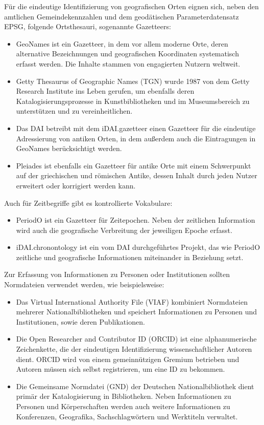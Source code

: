Für die eindeutige Identifizierung von geografischen Orten eignen sich, neben den amtlichen Gemeindekennzahlen und dem geodätischen Parameterdatensatz EPSG, folgende Ortsthesauri, sogenannte Gazetteers:
\begin{itemize}
	\item GeoNames ist ein Gazetteer, in dem vor allem moderne Orte, deren alternative Bezeichnungen und geografischen Koordinaten systematisch erfasst werden. Die Inhalte stammen von engagierten Nutzern weltweit.
	\item Getty Thesaurus of Geographic Names (TGN) wurde 1987 von dem Getty Research Institute ins Leben gerufen, um ebenfalls deren Katalogisierungsprozesse in Kunstbibliotheken und im Museumsbereich zu unterstützen und zu vereinheitlichen.
	\item Das DAI betreibt mit dem iDAI.gazetteer einen Gazetteer für die eindeutige Adressierung von antiken Orten, in dem außerdem auch die Eintragungen in GeoNames berücksichtigt werden.
	\item Pleiades ist ebenfalls ein Gazetteer für antike Orte mit einem Schwerpunkt auf der griechischen und römischen Antike, dessen Inhalt durch jeden Nutzer erweitert oder korrigiert werden kann.
\end{itemize}

Auch für Zeitbegriffe gibt es kontrollierte Vokabulare:
\begin{itemize}
	\item PeriodO ist ein Gazetteer für Zeitepochen. Neben der zeitlichen Information wird auch die geografische Verbreitung der jeweiligen Epoche erfasst.
	\item iDAI.chronontology ist ein vom DAI durchgeführtes Projekt, das wie PeriodO zeitliche und geografische Informationen miteinander in Beziehung setzt.
\end{itemize}

Zur Erfassung von Informationen zu Personen oder Institutionen sollten Normdateien verwendet werden, wie beispielsweise:
\begin{itemize}
	\item Das Virtual International Authority File (VIAF) kombiniert Normdateien mehrerer Nationalbibliotheken und speichert Informationen zu Personen und Institutionen, sowie deren Publikationen.
	\item Die Open Researcher and Contributor ID (ORCID) ist eine alphanumerische Zeichenkette, die der eindeutigen Identifizierung wissenschaftlicher Autoren dient. ORCID wird von einem gemeinnützigen Gremium betrieben und Autoren müssen sich selbst registrieren, um eine ID zu bekommen.
	\item Die Gemeinsame Normdatei (GND) der Deutschen Nationalbibliothek dient primär der Katalogisierung in Bibliotheken. Neben Informationen zu Personen und Körperschaften werden auch weitere Informationen zu Konferenzen, Geografika, Sachschlagwörtern und Werktiteln verwaltet.
\end{itemize}

